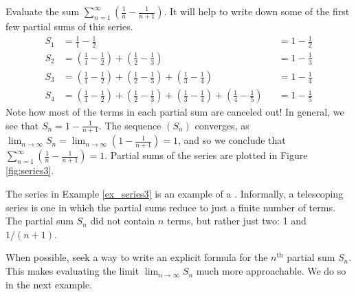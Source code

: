 \documentclass{ximera}
\begin{document}
Evaluate the sum $\sum_{n=1}^\infty \left(\frac1n-\frac1{n+1}\right)$.
It will help to write down some of the first few partial sums of this series.
\begin{align*}
S_1 &=	\frac11-\frac12 & & = 1-\frac12\\
S_2 &=	\left(\frac11-\frac12\right) + \left(\frac12-\frac13\right) & & = 1-\frac13\\
S_3 &=	\left(\frac11-\frac12\right) + \left(\frac12-\frac13\right)+\left(\frac13-\frac14\right) & &= 1-\frac14\\
S_4 &=	\left(\frac11-\frac12\right) + \left(\frac12-\frac13\right)+\left(\frac13-\frac14\right) +\left(\frac14-\frac15\right)& &= 1-\frac15
\end{align*}
Note how most of the terms in each partial sum are canceled out! In
general, we see that $S_n = 1-\frac{1}{n+1}$. The sequence $(S_n)$
converges, as $\lim_{n\to\infty}S_n =
\lim_{n\to\infty}\left(1-\frac1{n+1}\right) = 1$, and so we conclude
that $\sum_{n=1}^\infty \left(\frac1n-\frac1{n+1}\right) = 1$. Partial
sums of the series are plotted in Figure \ref{fig:series3}.


The series in Example \ref{ex_series3} is an example of a . Informally, a telescoping series is one in which the partial sums reduce to just a finite number of terms. The partial sum $S_n$ did not contain $n$ terms, but rather just two: 1 and $1/(n+1)$.

When possible, seek a way to write an explicit formula for the $n^\text{th}$ partial sum $S_n$. This makes evaluating the limit $\lim_{n\to\infty} S_n$ much more approachable. We do so in the next example.\\

\end{document}
